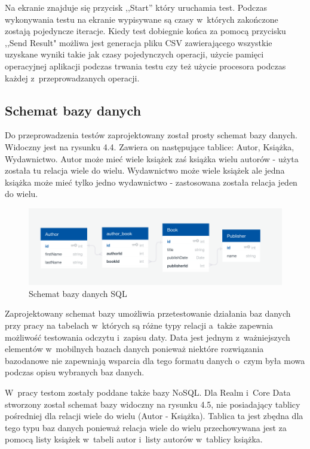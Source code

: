 \newpage

Na ekranie znajduje się przycisk ,,Start''  który uruchamia test. Podczas wykonywania testu na ekranie wypisywane są czasy w~których zakończone zostają pojedyncze iteracje. Kiedy test dobiegnie końca za pomocą przycisku ,,Send Result" możliwa jest generacja pliku CSV zawierającego wszystkie uzyskane wyniki takie jak czasy pojedynczych operacji, użycie pamięci operacyjnej aplikacji podczas trwania testu czy też użycie procesora podczas każdej z~przeprowadzanych operacji. 

\subsection{Schemat bazy danych}

Do przeprowadzenia testów zaprojektowany został prosty schemat bazy danych. Widoczny jest na rysunku 4.4. Zawiera on następujące tablice: Autor, Książka, Wydawnictwo. Autor może mieć wiele książek zaś książka wielu autorów - użyta została tu relacja wiele do wielu. Wydawnictwo może wiele książek ale jedna książka może mieć tylko jedno wydawnictwo - zastosowana została relacja jeden do wielu. 

\begin{figure}[h]
\centering
	\includegraphics[width=\linewidth]{img/database/sql-scheme.png}
	\caption{Schemat bazy danych SQL}
	\label{fig: sql_data_schame}
\end{figure}

Zaprojektowany schemat bazy umożliwia przetestowanie działania baz danych przy pracy na tabelach w~których są różne typy relacji a~także zapewnia możliwość testowania odczytu i~zapisu daty. Data jest jednym z~ważniejszych elementów w~mobilnych bazach danych ponieważ niektóre rozwiązania bazodanowe nie zapewniają wsparcia dla tego formatu danych o~czym była mowa podczas opisu wybranych baz danych. \par 

 W~pracy testom zostały poddane także bazy NoSQL. Dla Realm i~Core Data stworzony został schemat bazy widoczny na rysunku 4.5, nie posiadający tablicy pośredniej dla relacji wiele do wielu (Autor - Książka). Tablica ta jest zbędna dla tego typu baz danych ponieważ relacja wiele do wielu przechowywana jest za pomocą listy książek w~tabeli autor i~listy autorów w~tablicy książka. 

